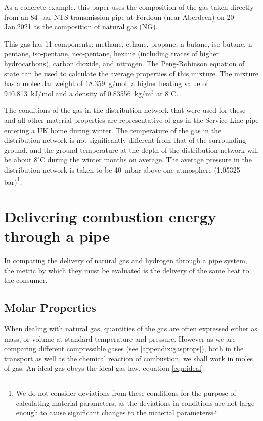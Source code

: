 \documentclass[5p]{elsarticle} %
\begin{document}
As a concrete example, this paper uses the composition of the gas taken directly from an 84~bar NTS transmission pipe at Fordoun (near Aberdeen) on 20 Jan.2021\citep{cngservices2019} as the composition of natural gas (NG). 

This gas has  11 components: methane, ethane, propane, n-butane, iso-butane, n-pentane, iso-pentane, neo-pentane, hexane (including traces of higher hydrocarbons), carbon dioxide, and nitrogen. 
The Peng-Robinson equation of state can be used to calculate the average properties
of this mixture\citep{Sargents_github}. 
The mixture has a molecular weight of 18.359~g/mol, a higher heating value of 940.813~kJ/mol and a density of 0.83556~kg/m$^3$ at 8$^\circ$C.

The conditions of the gas in the distribution network that were used for these and all other material properties are representative of gas in the Service Line pipe entering a UK home during winter. 
The temperature of the gas in the distribution network is not significantly different from that of the surrounding ground, and the ground temperature at the depth of the distribution network will be about $8^\circ$C during the winter months  on average\citep{MacKay2008}.
The average pressure in the distribution network is taken to be 40~mbar above one atmosphere (1.05325 bar)\citep{ARUP2023,utonomy23}\footnote{We do not consider deviations from these conditions for the purpose of calculating material parameters, as the deviations in conditions are not large enough to cause significant changes to the material parameters}.

\section{Delivering combustion energy through a pipe}
\label{sec:pipe}

In comparing the delivery of natural gas and hydrogen through a pipe system, the metric by which they must be evaluated is the delivery of the same heat to the consumer. 

\subsection{Molar Properties}
\label{sec:molar}

When dealing with natural gas, quantities of the gas are often expressed either as mass, or volume at standard temperature and pressure. 
However as we are comparing different compressible gases (see \ref{appendix:gasprops}), both in the transport as well as the chemical reaction of combustion, we shall work in moles of gas.
An ideal gas obeys the ideal gas law, equation \eqref{eqn:ideal}.
\end{document}
